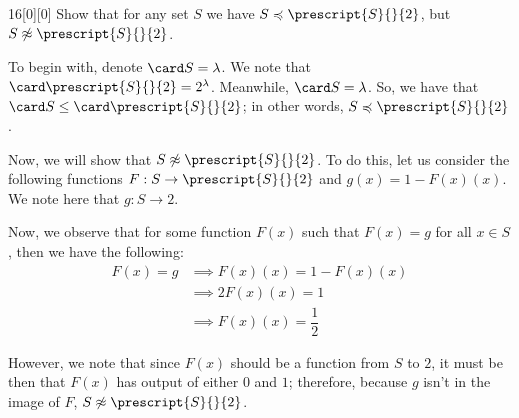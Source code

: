 \documentclass{article}
\begin{document}
\begin{hw}{16}[0][0]
	Show that for any set $S$ we have $S \preccurlyeq \prescript{S}{}{2}$, but $S \not\approx \prescript{S}{}{2}$.
\end{hw}
\begin{solution}
	To begin with, denote $\card S = \lambda$. We note that $\card \prescript{S}{}{2} = 2^{\lambda}$. Meanwhile, $\card S = \lambda$. So, we have that $\card S \leq \card \prescript{S}{}{2}$; in other words, $S \preccurlyeq\prescript{S}{}{2}$.
	
	Now, we will show that $S \not\approx \prescript{S}{}{2}$. To do this, let us consider the following functions $F: S \rightarrow \prescript{S}{}{2}$ and $g(x) = 1 - F(x)(x)$. We note here that $g : S \rightarrow 2$.
	
	Now, we observe that for some function $F(x)$ such that $F(x) = g$ for all $x \in S$, then we have the following:
	\begin{align*}
		F(x) = g &\implies F(x)(x) = 1 - F(x)(x) \\
		&\implies 2F(x)(x) = 1 \\
		&\implies F(x)(x) = \dfrac{1}{2}
	\end{align*}

	However, we note that since $F(x)$ should be a function from $S$ to $2$, it must be then that $F(x)$ has output of either $0$ and $1$; therefore, because $g$ isn't in the image of $F$, $S \not\approx\prescript{S}{}{2}$.
\end{solution}
\end{document}
